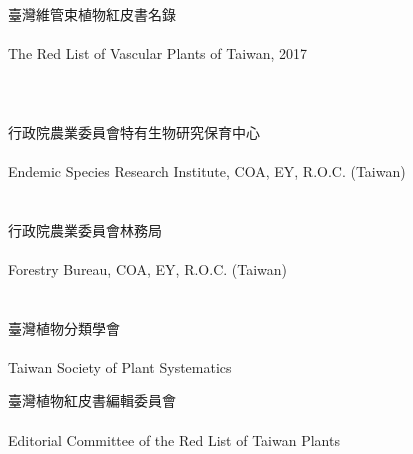 \thispagestyle{empty}
\vspace{1cm}
{\fontsize{56pt}{60pt}\selectfont
{} \\}
\hfill \\
{%
\fontsize{24pt}{26pt} 臺灣維管束植物紅皮書名錄 \\ 
\hfill \\
The Red List of Vascular Plants of Taiwan, 2017}
\hfill \\
\hfill \\
\hfill \\
\hfill \\
{\fontsize{18pt}{20pt}\selectfont
行政院農業委員會特有生物研究保育中心 \\
\hfill \\
Endemic Species Research Institute, COA, EY, R.O.C. (Taiwan) \\
\hfill \\
\hfill \\
行政院農業委員會林務局 \\
\hfill \\
Forestry Bureau, COA, EY, R.O.C. (Taiwan) \\ 
\hfill \\
\hfill \\
臺灣植物分類學會 \\ 
\hfill \\
Taiwan Society of Plant Systematics}
\hfill \\
\par
\vfill
{\fontsize{16pt}{20pt}\selectfont
\noindent 臺灣植物紅皮書編輯委員會\\  } 
\hfill \\
{\fontsize{16pt}{20pt}\selectfont
Editorial Committee of the Red List of Taiwan Plants} 
\newpage
\thispagestyle{empty}
\mbox{}
